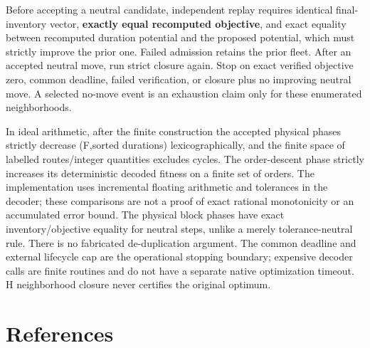 \documentclass[
  american,
  11pt,
]{article}
\begin{document}
Before accepting a neutral candidate, independent replay requires
identical final-inventory vector, \textbf{exactly equal recomputed
objective}, and exact equality between recomputed duration potential and
the proposed potential, which must strictly improve the prior one.
Failed admission retains the prior fleet. After an accepted neutral
move, run strict closure again. Stop on exact verified objective zero,
common deadline, failed verification, or closure plus no improving
neutral move. A selected no-move event is an exhaustion claim only for
these enumerated neighborhoods.

In ideal arithmetic, after the finite construction the accepted physical
phases strictly decrease (F,sorted durations) lexicographically, and the
finite space of labelled routes/integer quantities excludes cycles. The
order-descent phase strictly increases its deterministic decoded fitness
on a finite set of orders. The implementation uses incremental floating
arithmetic and tolerances in the decoder; these comparisons are not a
proof of exact rational monotonicity or an accumulated error bound. The
physical block phases have exact inventory/objective equality for
neutral steps, unlike a merely tolerance-neutral rule. There is no
fabricated de-duplication argument. The common deadline and external
lifecycle cap are the operational stopping boundary; expensive decoder
calls are finite routines and do not have a separate native optimization
timeout. H neighborhood closure never certifies the original optimum.

\clearpage

\section{References}\label{references}
\end{document}
